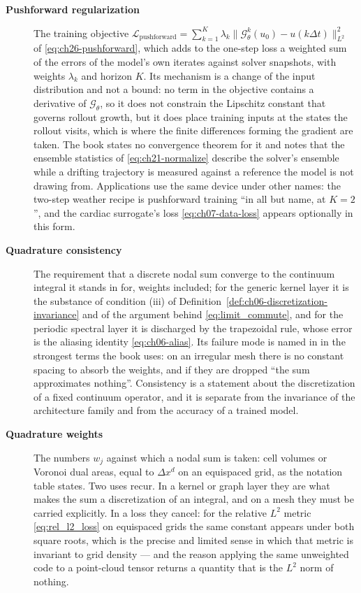 \begin{description}
\item[\textbf{Pushforward regularization}] The training objective
$\mathcal{L}_{\text{pushforward}} = \sum_{k=1}^{K} \lambda_{k} \|\mathcal{G}_{\theta}^{k}(u_{0})
- u(k\Delta t)\|_{L^{2}}^{2}$ of \eqref{eq:ch26-pushforward}, which adds to the one-step
loss a weighted sum of the errors of the model's own iterates against solver snapshots,
with weights $\lambda_{k}$ and horizon $K$. Its mechanism is a change of the input
distribution and not a bound: no term in the objective contains a derivative of
$\mathcal{G}_{\theta}$, so it does not constrain the Lipschitz constant that governs
rollout growth, but it does place training inputs at the states the rollout visits, which
is where the finite differences forming the gradient are taken. The book states no
convergence theorem for it and notes that the ensemble statistics of
\eqref{eq:ch21-normalize} describe the solver's ensemble while a drifting trajectory is
measured against a reference the model is not drawing from. Applications use the same
device under other names: the two-step weather recipe is pushforward training ``in all
but name, at $K = 2$'', and the cardiac surrogate's loss \eqref{eq:ch07-data-loss} appears
optionally in this form. 

\item[\textbf{Quadrature consistency}] The requirement that a discrete nodal sum converge
to the continuum integral it stands in for, weights included; for the generic kernel layer
it is the substance of condition (iii) of Definition~\ref{def:ch06-discretization-invariance}
and of the argument behind \eqref{eq:limit_commute}, and for the periodic spectral layer it
is discharged by the trapezoidal rule, whose error is the aliasing identity
\eqref{eq:ch06-alias}. Its failure mode is named in 
in the strongest terms the book uses: on an irregular mesh there is no constant spacing to
absorb the weights, and if they are dropped ``the sum approximates nothing''. Consistency is
a statement about the discretization of a fixed continuum operator, and it is separate from
the invariance of the architecture family and from the accuracy of a trained model.

\item[\textbf{Quadrature weights}] The numbers $w_j$ against which a nodal sum is taken:
cell volumes or Voronoi dual areas, equal to $\Delta x^{d}$ on an equispaced grid, as the
notation table states. Two uses recur. In a kernel or graph layer they are what makes the
sum a discretization of an integral, and on a mesh they must be carried explicitly. In a
loss they cancel: for the relative $L^{2}$ metric \eqref{eq:rel_l2_loss} on equispaced
grids the same constant appears under both square roots, which is the precise and limited
sense in which that metric is invariant to grid density --- and the reason applying the
same unweighted code to a point-cloud tensor returns a quantity that is the $L^{2}$ norm
of nothing. 


\end{description}
